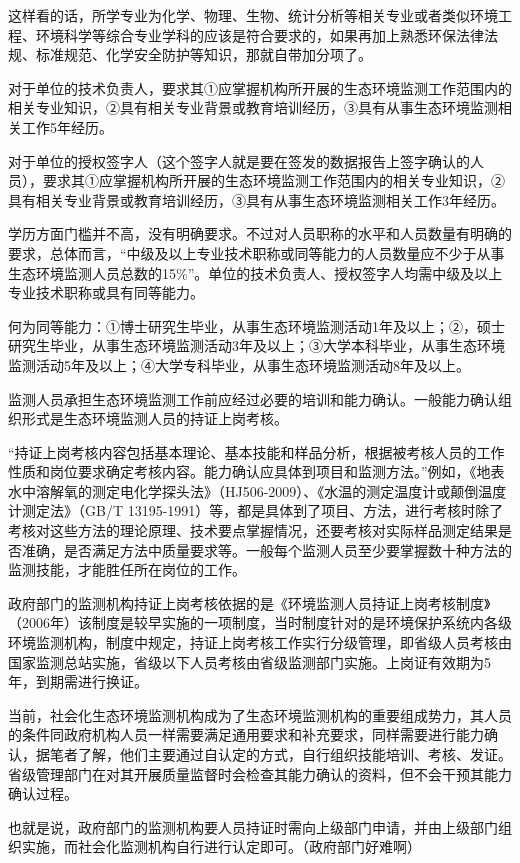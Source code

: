 \documentclass[
]{book}
\begin{document}
这样看的话，所学专业为化学、物理、生物、统计分析等相关专业或者类似环境工程、环境科学等综合专业学科的应该是符合要求的，如果再加上熟悉环保法律法规、标准规范、化学安全防护等知识，那就自带加分项了。

对于单位的技术负责人，要求其①应掌握机构所开展的生态环境监测工作范围内的相关专业知识，②具有相关专业背景或教育培训经历，③具有从事生态环境监测相关工作5年经历。

对于单位的授权签字人（这个签字人就是要在签发的数据报告上签字确认的人员），要求其①应掌握机构所开展的生态环境监测工作范围内的相关专业知识，②具有相关专业背景或教育培训经历，③具有从事生态环境监测相关工作3年经历。

学历方面门槛并不高，没有明确要求。不过对人员职称的水平和人员数量有明确的要求，总体而言，``中级及以上专业技术职称或同等能力的人员数量应不少于从事生态环境监测人员总数的15\%''。单位的技术负责人、授权签字人均需中级及以上专业技术职称或具有同等能力。

何为同等能力：①博士研究生毕业，从事生态环境监测活动1年及以上；②，硕士研究生毕业，从事生态环境监测活动3年及以上；③大学本科毕业，从事生态环境监测活动5年及以上；④大学专科毕业，从事生态环境监测活动8年及以上。

监测人员承担生态环境监测工作前应经过必要的培训和能力确认。一般能力确认组织形式是生态环境监测人员的持证上岗考核。

``持证上岗考核内容包括基本理论、基本技能和样品分析，根据被考核人员的工作性质和岗位要求确定考核内容。能力确认应具体到项目和监测方法。''例如，《地表水中溶解氧的测定电化学探头法》（HJ506-2009）、《水温的测定温度计或颠倒温度计测定法》（GB/T 13195-1991）等，都是具体到了项目、方法，进行考核时除了考核对这些方法的理论原理、技术要点掌握情况，还要考核对实际样品测定结果是否准确，是否满足方法中质量要求等。一般每个监测人员至少要掌握数十种方法的监测技能，才能胜任所在岗位的工作。

政府部门的监测机构持证上岗考核依据的是《环境监测人员持证上岗考核制度》（2006年）该制度是较早实施的一项制度，当时制度针对的是环境保护系统内各级环境监测机构，制度中规定，持证上岗考核工作实行分级管理，即省级人员考核由国家监测总站实施，省级以下人员考核由省级监测部门实施。上岗证有效期为5年，到期需进行换证。

当前，社会化生态环境监测机构成为了生态环境监测机构的重要组成势力，其人员的条件同政府机构人员一样需要满足通用要求和补充要求，同样需要进行能力确认，据笔者了解，他们主要通过自认定的方式，自行组织技能培训、考核、发证。省级管理部门在对其开展质量监督时会检查其能力确认的资料，但不会干预其能力确认过程。

也就是说，政府部门的监测机构要人员持证时需向上级部门申请，并由上级部门组织实施，而社会化监测机构自行进行认定即可。（政府部门好难啊）
\end{document}
